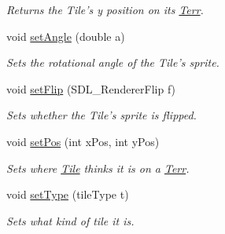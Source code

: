 \begin{DoxyCompactItemize}
\begin{DoxyCompactList}\small\item\em Returns the Tile’s y position on its \hyperlink{class_terr}{Terr}. \end{DoxyCompactList}\item 
void \hyperlink{class_tile_a94f9e2d35e55c1d1b9f56dbd7816f51a}{set\+Angle} (double a)\hypertarget{class_tile_a94f9e2d35e55c1d1b9f56dbd7816f51a}{}\label{class_tile_a94f9e2d35e55c1d1b9f56dbd7816f51a}

\begin{DoxyCompactList}\small\item\em Sets the rotational angle of the Tile’s sprite. \end{DoxyCompactList}\item 
void \hyperlink{class_tile_a801a349b0e7f7500b60af91e5e821f2e}{set\+Flip} (S\+D\+L\+\_\+\+Renderer\+Flip f)\hypertarget{class_tile_a801a349b0e7f7500b60af91e5e821f2e}{}\label{class_tile_a801a349b0e7f7500b60af91e5e821f2e}

\begin{DoxyCompactList}\small\item\em Sets whether the Tile’s sprite is flipped. \end{DoxyCompactList}\item 
void \hyperlink{class_tile_a8a6429d2adbe3e45c519d86a57b514c3}{set\+Pos} (int x\+Pos, int y\+Pos)\hypertarget{class_tile_a8a6429d2adbe3e45c519d86a57b514c3}{}\label{class_tile_a8a6429d2adbe3e45c519d86a57b514c3}

\begin{DoxyCompactList}\small\item\em Sets where \hyperlink{class_tile}{Tile} thinks it is on a \hyperlink{class_terr}{Terr}. \end{DoxyCompactList}\item 
void \hyperlink{class_tile_a2557595d030a43cf9b5334df3b7264f7}{set\+Type} (tile\+Type t)\hypertarget{class_tile_a2557595d030a43cf9b5334df3b7264f7}{}\label{class_tile_a2557595d030a43cf9b5334df3b7264f7}

\begin{DoxyCompactList}\small\item\em Sets what kind of tile it is. \end{DoxyCompactList}\end{DoxyCompactItemize}
